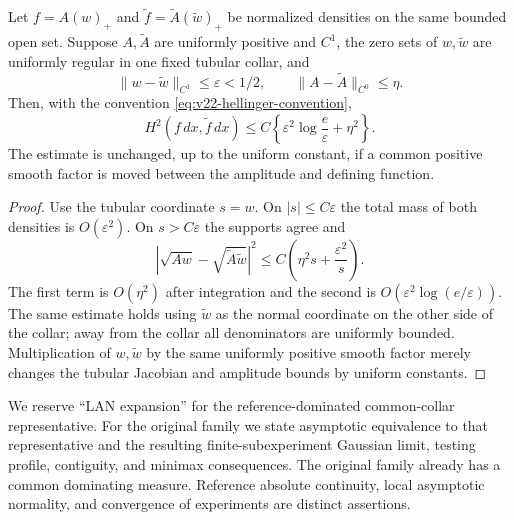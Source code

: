 \begin{lemma}
\label{lem:v22-hypersurface-stability}
Let $f=A(w)_+$ and $\widetilde f=\widetilde A(\widetilde w)_+$ be normalized
densities on the same bounded open set.  Suppose $A,\widetilde A$ are
uniformly positive and $C^1$, the zero sets of $w,\widetilde w$ are uniformly
regular in one fixed tubular collar, and
\[
 \|w-\widetilde w\|_{C^1}\le\varepsilon<1/2,
 \qquad
 \|A-\widetilde A\|_{C^0}\le\eta.
\]
Then, with the convention \eqref{eq:v22-hellinger-convention},
\begin{equation}\label{eq:v22-hypersurface-stability}
 H^2(f\,dx,\widetilde f\,dx)
 \le C\left\{\varepsilon^2\log\frac e\varepsilon+\eta^2\right\}.
\end{equation}
The estimate is unchanged, up to the uniform constant, if a common positive
smooth factor is moved between the amplitude and defining function.
\end{lemma}

\begin{proof}
Use the tubular coordinate $s=w$.  On $|s|\le C\varepsilon$ the total mass of
both densities is $O(\varepsilon^2)$.  On $s>C\varepsilon$ the supports agree
and
\[
 |\sqrt{Aw}-\sqrt{\widetilde A\widetilde w}|^2
 \le C\left(\eta^2s+\frac{\varepsilon^2}{s}\right).
\]
The first term is $O(\eta^2)$ after integration and the second is
$O(\varepsilon^2\log(e/\varepsilon))$.  The same estimate holds using
$\widetilde w$ as the normal coordinate on the other side of the collar;
away from the collar all denominators are uniformly bounded.  Multiplication
of $w,\widetilde w$ by the same uniformly positive smooth factor merely
changes the tubular Jacobian and amplitude bounds by uniform constants.
\end{proof}

\begin{remark}[Terminology]
We reserve ``LAN expansion'' for the reference-dominated common-collar representative.
For the original family we state asymptotic equivalence to that representative
and the resulting finite-subexperiment Gaussian limit, testing profile,
contiguity, and minimax consequences.  The original family already has a common dominating measure.
Reference absolute continuity, local asymptotic normality, and convergence
of experiments are distinct assertions.
\end{remark}
